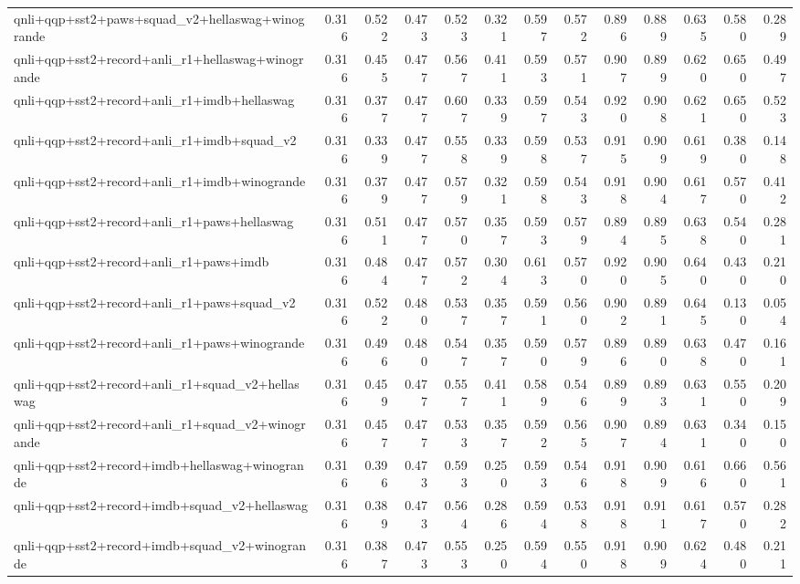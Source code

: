 \begin{table}[t]
\begin{tabular}{lrrrrrrrrrrrr}
    qnli+qqp+sst2+paws+squad\_v2+hellaswag+winogrande & 0.316 & 0.522 & 0.473 & 0.523 & 0.321 & 0.597 & 0.572 & 0.896 & 0.889 & 0.635 & 0.580 & 0.289 \\
    qnli+qqp+sst2+record+anli\_r1+hellaswag+winogrande & 0.316 & 0.455 & 0.477 & 0.567 & 0.411 & 0.593 & 0.571 & 0.907 & 0.899 & 0.620 & 0.650 & 0.497 \\
    qnli+qqp+sst2+record+anli\_r1+imdb+hellaswag & 0.316 & 0.377 & 0.477 & 0.607 & 0.339 & 0.597 & 0.543 & 0.920 & 0.908 & 0.621 & 0.650 & 0.523 \\
    qnli+qqp+sst2+record+anli\_r1+imdb+squad\_v2 & 0.316 & 0.339 & 0.477 & 0.558 & 0.339 & 0.598 & 0.537 & 0.915 & 0.909 & 0.619 & 0.380 & 0.148 \\
    qnli+qqp+sst2+record+anli\_r1+imdb+winogrande & 0.316 & 0.379 & 0.477 & 0.579 & 0.321 & 0.598 & 0.543 & 0.918 & 0.904 & 0.617 & 0.570 & 0.412 \\
    qnli+qqp+sst2+record+anli\_r1+paws+hellaswag & 0.316 & 0.511 & 0.477 & 0.570 & 0.357 & 0.593 & 0.579 & 0.894 & 0.895 & 0.638 & 0.540 & 0.281 \\
    qnli+qqp+sst2+record+anli\_r1+paws+imdb & 0.316 & 0.484 & 0.477 & 0.572 & 0.304 & 0.613 & 0.570 & 0.920 & 0.905 & 0.640 & 0.430 & 0.210 \\
    qnli+qqp+sst2+record+anli\_r1+paws+squad\_v2 & 0.316 & 0.522 & 0.480 & 0.537 & 0.357 & 0.591 & 0.560 & 0.902 & 0.891 & 0.645 & 0.130 & 0.054 \\
    qnli+qqp+sst2+record+anli\_r1+paws+winogrande & 0.316 & 0.496 & 0.480 & 0.547 & 0.357 & 0.590 & 0.579 & 0.896 & 0.890 & 0.638 & 0.470 & 0.161 \\
    qnli+qqp+sst2+record+anli\_r1+squad\_v2+hellaswag & 0.316 & 0.459 & 0.477 & 0.557 & 0.411 & 0.589 & 0.546 & 0.899 & 0.893 & 0.631 & 0.550 & 0.209 \\
    qnli+qqp+sst2+record+anli\_r1+squad\_v2+winogrande & 0.316 & 0.457 & 0.477 & 0.533 & 0.357 & 0.592 & 0.565 & 0.907 & 0.894 & 0.631 & 0.340 & 0.150 \\
    qnli+qqp+sst2+record+imdb+hellaswag+winogrande & 0.316 & 0.396 & 0.473 & 0.593 & 0.250 & 0.593 & 0.546 & 0.918 & 0.909 & 0.616 & 0.660 & 0.561 \\
    qnli+qqp+sst2+record+imdb+squad\_v2+hellaswag & 0.316 & 0.389 & 0.473 & 0.564 & 0.286 & 0.594 & 0.538 & 0.918 & 0.911 & 0.617 & 0.570 & 0.282 \\
    qnli+qqp+sst2+record+imdb+squad\_v2+winogrande & 0.316 & 0.387 & 0.473 & 0.553 & 0.250 & 0.594 & 0.550 & 0.918 & 0.909 & 0.624 & 0.480 & 0.211 \\

\end{tabular}
\end{table}
